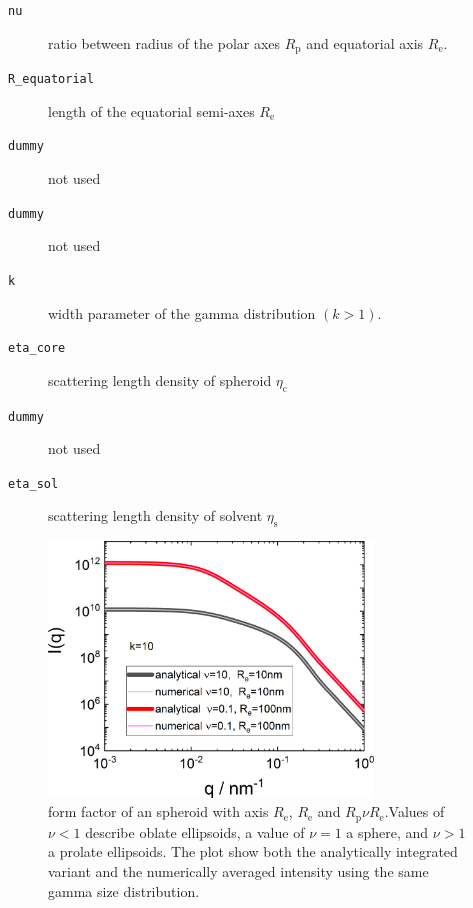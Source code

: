 \begin{description}
\item[\texttt{nu}]
ratio between radius of the polar axes $R_\mathrm{p}$ and equatorial axis $R_\mathrm{e}$.
\item[\texttt{R\_equatorial}] length of the equatorial semi-axes $R_\mathrm{e}$
\item[\texttt{dummy}] not used
\item[\texttt{dummy}] not used
\item[\texttt{k}] width parameter of the gamma distribution $(k>1)$.
\item[\texttt{eta\_core}] scattering length density of spheroid $\eta_\mathrm{c}$
\item[\texttt{dummy}] not used
\item[\texttt{eta\_sol}] scattering length density of solvent $\eta_\mathrm{s}$
\end{description}

\begin{figure}[htb]
\begin{center}
\includegraphics[width=0.768\textwidth]{../images/form_factor/Ellipsoid/spheroid_w_g_SD.png}
\end{center}
\caption{form factor of an spheroid with axis $R_\mathrm{e}$, $R_\mathrm{e}$ and $R_\mathrm{p}\nu
R_\mathrm{e}$.Values of $\nu<1$ describe oblate ellipsoids, a value of $\nu=1$ a
sphere, and $\nu>1$ a prolate ellipsoids. The plot show both the analytically integrated variant and the numerically averaged intensity using the same gamma size distribution.} \label{fig:I_spheroid_w_gSD}
\end{figure}

\newpage

